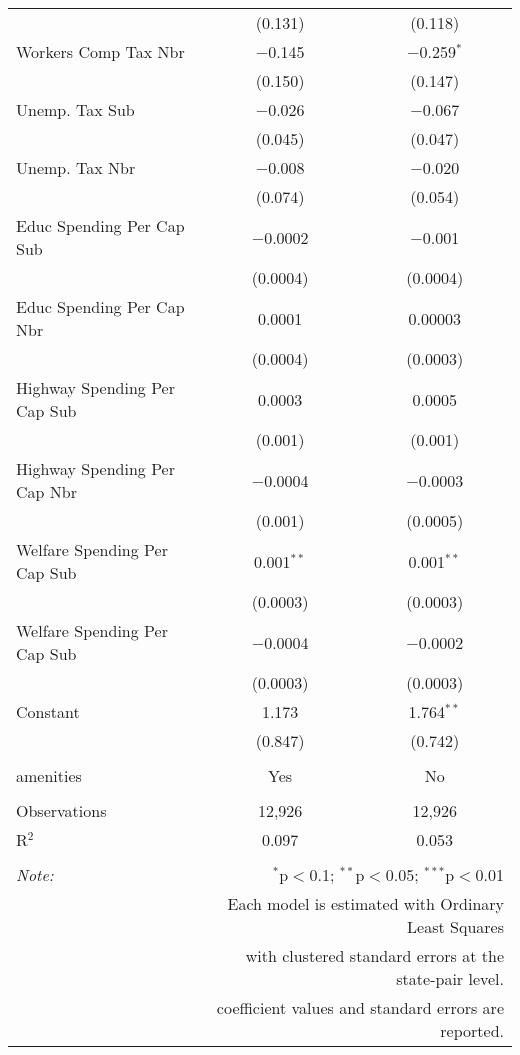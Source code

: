 \begin{table}[!htbp]
\begin{tabular}{@{\extracolsep{5pt}}lcc}
  & (0.131) & (0.118) \\ 
  Workers Comp Tax Nbr & $-$0.145 & $-$0.259$^{*}$ \\ 
  & (0.150) & (0.147) \\ 
  Unemp. Tax Sub & $-$0.026 & $-$0.067 \\ 
  & (0.045) & (0.047) \\ 
  Unemp. Tax Nbr & $-$0.008 & $-$0.020 \\ 
  & (0.074) & (0.054) \\ 
  Educ Spending Per Cap Sub & $-$0.0002 & $-$0.001 \\ 
  & (0.0004) & (0.0004) \\ 
  Educ Spending Per Cap Nbr & 0.0001 & 0.00003 \\ 
  & (0.0004) & (0.0003) \\ 
  Highway Spending Per Cap Sub & 0.0003 & 0.0005 \\ 
  & (0.001) & (0.001) \\ 
  Highway Spending Per Cap Nbr & $-$0.0004 & $-$0.0003 \\ 
  & (0.001) & (0.0005) \\ 
  Welfare Spending Per Cap Sub & 0.001$^{**}$ & 0.001$^{**}$ \\ 
  & (0.0003) & (0.0003) \\ 
  Welfare Spending Per Cap Sub & $-$0.0004 & $-$0.0002 \\ 
  & (0.0003) & (0.0003) \\ 
  Constant & 1.173 & 1.764$^{**}$ \\ 
  & (0.847) & (0.742) \\ 
 \hline \\[-1.8ex] 
amenities & Yes & No \\ 
\hline \\[-1.8ex] 
Observations & 12,926 & 12,926 \\ 
R$^{2}$ & 0.097 & 0.053 \\ 
\hline 
\hline \\[-1.8ex] 
\textit{Note:}  & \multicolumn{2}{r}{$^{*}$p$<$0.1; $^{**}$p$<$0.05; $^{***}$p$<$0.01} \\ 
 & \multicolumn{2}{r}{Each model is estimated with Ordinary Least Squares} \\ 
 & \multicolumn{2}{r}{with clustered standard errors at the state-pair level.} \\ 
 & \multicolumn{2}{r}{coefficient values and standard errors are reported.} \\ 
\end{tabular} 
\end{table} 
